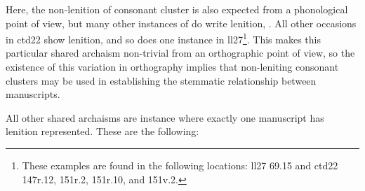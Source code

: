 Here, the non-lenition of  consonant cluster  is also expected from a phonological point of view, but many other instances of  do write lenition, \ie {}. All other occasions in \gls{ctd22} show lenition, and so does one instance in \gls{ll27}\footnote{These examples are found in the following locations: \gls{ll27} 69.15 and \gls{ctd22} 147r.12, 151r.2, 151r.10, and 151v.2.}. This makes this particular shared archaism non-trivial from an orthographic point of view, so the existence of this variation in orthography implies that non-leniting consonant clusters may be used in establishing the stemmatic relationship between  manuscripts. 

All other shared archaisms are instance where exactly one manuscript has lenition represented. These are the following:
